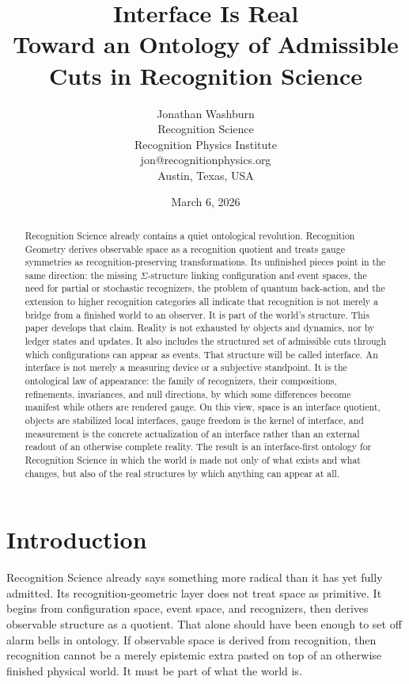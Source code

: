 \documentclass[11pt]{article}
\title{Interface Is Real\\Toward an Ontology of Admissible Cuts in Recognition Science}
\author{Jonathan Washburn\\Recognition Science\\Recognition Physics Institute\\jon@recognitionphysics.org\\Austin, Texas, USA}
\date{March 6, 2026}
\begin{document}
\maketitle

\begin{abstract}
Recognition Science already contains a quiet ontological revolution.
Recognition Geometry derives observable space as a recognition quotient and treats gauge symmetries as recognition-preserving transformations.
Its unfinished pieces point in the same direction: the missing $\Sigma$-structure linking configuration and event spaces, the need for partial or stochastic recognizers, the problem of quantum back-action, and the extension to higher recognition categories all indicate that recognition is not merely a bridge from a finished world to an observer.
It is part of the world's structure.
This paper develops that claim.
Reality is not exhausted by objects and dynamics, nor by ledger states and updates.
It also includes the structured set of admissible cuts through which configurations can appear as events.
That structure will be called interface.
An interface is not merely a measuring device or a subjective standpoint.
It is the ontological law of appearance: the family of recognizers, their compositions, refinements, invariances, and null directions, by which some differences become manifest while others are rendered gauge.
On this view, space is an interface quotient, objects are stabilized local interfaces, gauge freedom is the kernel of interface, and measurement is the concrete actualization of an interface rather than an external readout of an otherwise complete reality.
The result is an interface-first ontology for Recognition Science in which the world is made not only of what exists and what changes, but also of the real structures by which anything can appear at all.
\end{abstract}

\section{Introduction}

Recognition Science already says something more radical than it has yet fully admitted.
Its recognition-geometric layer does not treat space as primitive.
It begins from configuration space, event space, and recognizers, then derives observable structure as a quotient.
That alone should have been enough to set off alarm bells in ontology.
If observable space is derived from recognition, then recognition cannot be a merely epistemic extra pasted on top of an otherwise finished physical world.
It must be part of what the world is.
\end{document}
